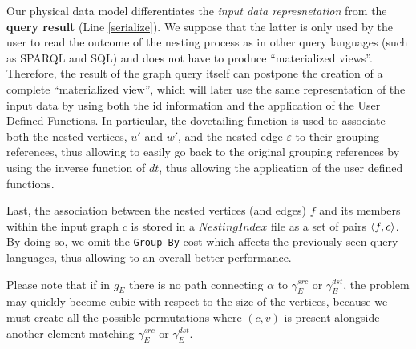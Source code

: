 

Our physical data model differentiates the \textit{input data  represnetation} from the \textbf{query result} (Line \ref{serialize}). 
We suppose that the latter is only used by the user to read the outcome of the nesting process as in other  query languages (such as SPARQL and SQL) and does not have to
produce ``materialized views''. Therefore, the result of the graph query itself can postpone the creation of a complete ``materialized view'', which will later use the same representation of the input data by using both the id information and the application of the User Defined Functions. In particular, the dovetailing function is used to associate both the nested vertices, $u'$ and $w'$, and the nested edge $\varepsilon$ to their grouping references, thus allowing to easily go back to the original grouping references by using the inverse function of $dt$, thus allowing the application of the user defined functions.


Last, the association between the nested vertices (and edges) $f$ and its members within the input graph $c$ is stored in a $NestingIndex$ file as a set of pairs $\Braket{f,c}$. By doing so, we omit the \texttt{Group By} cost which affects the previously seen query languages, thus allowing to an overall better performance. 



Please note that if in $g_E$ there is no path connecting $\alpha$ to $\gamma_E^{src}$ or $\gamma_E^{dst}$, the problem may quickly become cubic with respect to the size of the vertices, because we must create all the possible permutations where $(c,v)$ is present alongside another element matching $\gamma_E^{src}$ or $\gamma_E^{dst}$.